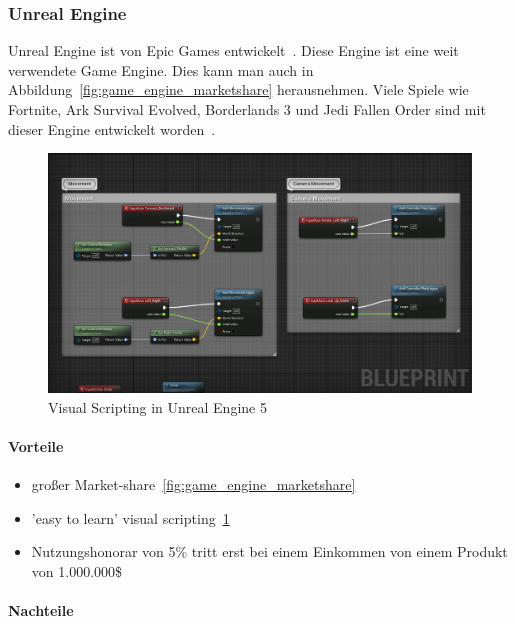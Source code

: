 \subsubsection{Unreal Engine}
\label{sec:unreal_engine}

Unreal Engine ist von Epic Games entwickelt~\cite{UNEAL_ENGINE_OWNER_2022}.
Diese Engine ist eine weit verwendete Game Engine.
Dies kann man auch in Abbildung~\ref{fig:game_engine_marketshare} herausnehmen.
Viele Spiele wie Fortnite, Ark Survival Evolved, Borderlands 3 und Jedi Fallen Order sind mit dieser Engine entwickelt worden~\cite{WIKIPEDIA_UNREAL_GAME_LIST}.

\begin{figure}
    \centering
    \includegraphics{pics/visual_scripting_unreal_engine}
    \caption{Visual Scripting in Unreal Engine 5}
    \label{fig:visual_scripting_unreal_engine}
\end{figure}

\paragraph{Vorteile}

\begin{itemize}
    \item großer Market-share~\ref{fig:game_engine_marketshare}
    \item 'easy to learn' visual scripting~\ref{fig:visual_scripting_unreal_engine}
    \item Nutzungshonorar von 5\% tritt erst bei einem Einkommen von einem Produkt von 1.000.000\$~\cite{UNREAL_ENGINE_PRICING_2022}
\end{itemize}

\paragraph{Nachteile}

